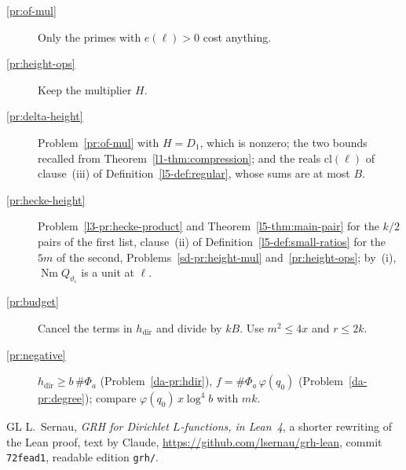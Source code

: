 \documentclass[reqno]{amsart}
\theoremstyle{definition}
\theoremstyle{plain}
\newcommand{\Nm}{\operatorname{Nm}}
\newcommand{\hdir}{h_{\mathrm{dir}}}
\begin{document}
\begin{description}
\item[\ref{pr:of-mul}] Only the primes with \(e(\ell) > 0\) cost anything.
\item[\ref{pr:height-ops}] Keep the multiplier \(H\).
\item[\ref{pr:delta-height}] Problem~\ref{pr:of-mul} with \(H = D_1\), which is nonzero; the two bounds recalled from Theorem~\ref{l1-thm:compression}; and the reals \(\mathrm{cl}(\ell)\) of clause~(iii) of Definition~\ref{l5-def:regular}, whose sums are at most \(B\).
\item[\ref{pr:hecke-height}] Problem~\ref{l3-pr:hecke-product} and Theorem~\ref{l5-thm:main-pair} for the \(k/2\) pairs of the first list, clause~(ii) of Definition~\ref{l5-def:small-ratios} for the \(5m\) of the second, Problems~\ref{sd-pr:height-mul} and~\ref{pr:height-ops}; by~(i), \(\Nm Q_{\vartheta_\iota}\) is a unit at \(\ell\).
\item[\ref{pr:budget}] Cancel the terms in \(\hdir\) and divide by \(kB\).  Use \(m^2 \le 4x\) and \(r \le 2k\).
\item[\ref{pr:negative}] \(\hdir \ge b\,\#\Phi_a\) (Problem~\ref{da-pr:hdir}), \(f = \#\Phi_a\,\varphi(q_0)\) (Problem~\ref{da-pr:degree}); compare \(\varphi(q_0)\,x\log^4 b\) with \(mk\).
\end{description}

\begin{thebibliography}{GL}
 L.~Sernau, \emph{GRH for Dirichlet \(L\)-functions, in Lean~4}, a shorter rewriting of the Lean proof, text by Claude, \url{https://github.com/lsernau/grh-lean}, commit \texttt{72fead1}, readable edition \texttt{grh/}.
\end{thebibliography}
\end{document}
